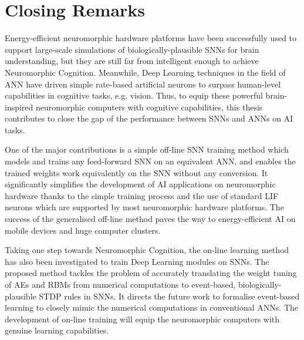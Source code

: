 \section{Closing Remarks}


Energy-efficient neuromorphic hardware platforms have been successfully used to support large-scale simulations of biologically-plausible SNNs for brain understanding, but they are still far from intelligent enough to achieve Neuromorphic Cognition.
Meanwhile, Deep Learning techniques in the field of ANN have driven simple rate-based artificial neurons to surpass human-level capabilities in cognitive tasks, e.g. vision.
Thus, to equip these powerful brain-inspired neuromorphic computers with cognitive capabilities, this thesis contributes to close the gap of the performance between SNNs and ANNs on AI tasks.

One of the major contributions is a simple off-line SNN training method which models and trains any feed-forward SNN on an equivalent ANN, and enables the trained weights work equivalently on the SNN without any conversion.
It significantly simplifies the development of AI applications on neuromorphic hardware thanks to the simple training process and the use of standard LIF neurons which are supported by most neuromorphic hardware platforms.
The success of the generalised off-line method paves the way to energy-efficient AI on mobile devices and huge computer clusters.


Taking one step towards Neuromorphic Cognition, the on-line learning method has also been investigated to train Deep Learning modules on SNNs.
The proposed method tackles the problem of accurately translating the weight tuning of AEs and RBMs from numerical computations to event-based, biologically-plausible STDP rules in SNNs.
It directs the future work to formalise event-based learning to closely mimic the numerical computations in conventional ANNs.
The development of on-line training will equip the neuromorphic computers with genuine learning capabilities.

